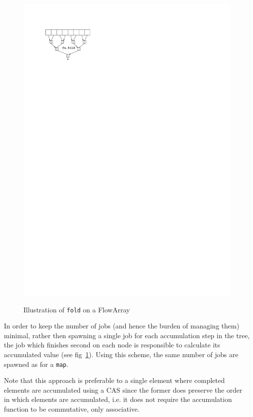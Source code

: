 \documentclass[runningheads,a4paper,fleqn]{llncs}
\begin{document}
\begin{figure}
{    \includegraphics{fa-fold-calc}%
    \label{fig:fa-fold-calc}}
  \caption{Illustration of \texttt{fold} on a FlowArray}
\end{figure}

In order to keep the number of jobs (and hence the burden of managing
them) minimal, rather then spawning a single job for each accumulation
step in the tree, the job which finishes second on each node is
responsible to calculate its accumulated value (see
fig~\ref{fig:fa-fold-calc}). Using this scheme, the 
same number of jobs are spawned as for a \texttt{map}.

Note that this approach is preferable to a single element where
completed elements are accumulated using a CAS since the former
does preserve the order in which elements are accumulated, i.e. it
does not require the accumulation function to be commutative, only
associative.
\end{document}
